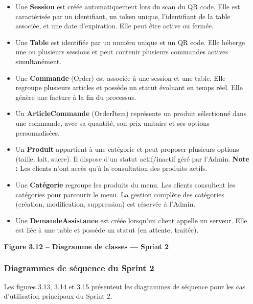 \begin{itemize}
\item Une \textbf{Session} est créée automatiquement lors du scan du QR code. Elle est caractérisée par un identifiant, un token unique, l'identifiant de la table associée, et une date d'expiration. Elle peut être active ou fermée.

\item Une \textbf{Table} est identifiée par un numéro unique et un QR code. Elle héberge une ou plusieurs sessions et peut contenir plusieurs commandes actives simultanément.

\item Une \textbf{Commande} (Order) est associée à une session et une table. Elle regroupe plusieurs articles et possède un statut évoluant en temps réel. Elle génère une facture à la fin du processus.

\item Un \textbf{ArticleCommande} (OrderItem) représente un produit sélectionné dans une commande, avec sa quantité, son prix unitaire et ses options personnalisées.

\item Un \textbf{Produit} appartient à une catégorie et peut proposer plusieurs options (taille, lait, sucre). Il dispose d'un statut actif/inactif géré par l'Admin. \textbf{Note :} Les clients n'ont accès qu'à la consultation des produits actifs.

\item Une \textbf{Catégorie} regroupe les produits du menu. Les clients consultent les catégories pour parcourir le menu. La gestion complète des catégories (création, modification, suppression) est réservée à l'Admin.

\item Une \textbf{DemandeAssistance} est créée lorsqu'un client appelle un serveur. Elle est liée à une table et possède un statut (en attente, traitée).

\end{itemize}

\textbf{Figure 3.12 – Diagramme de classes — Sprint 2}

\subsubsection{Diagrammes de séquence du Sprint 2}

Les figures 3.13, 3.14 et 3.15 présentent les diagrammes de séquence pour les cas d'utilisation principaux du Sprint 2.

